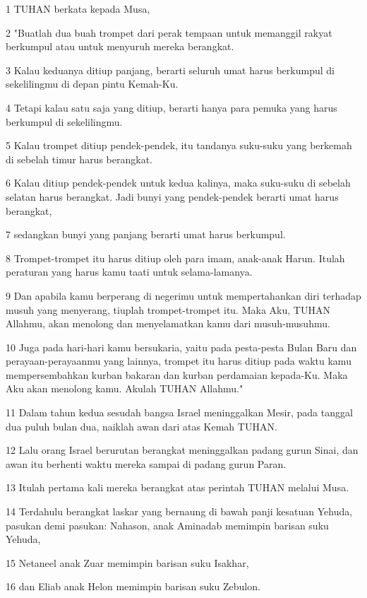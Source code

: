 \par 1 TUHAN berkata kepada Musa,
\par 2 "Buatlah dua buah trompet dari perak tempaan untuk memanggil rakyat berkumpul atau untuk menyuruh mereka berangkat.
\par 3 Kalau keduanya ditiup panjang, berarti seluruh umat harus berkumpul di sekelilingmu di depan pintu Kemah-Ku.
\par 4 Tetapi kalau satu saja yang ditiup, berarti hanya para pemuka yang harus berkumpul di sekelilingmu.
\par 5 Kalau trompet ditiup pendek-pendek, itu tandanya suku-suku yang berkemah di sebelah timur harus berangkat.
\par 6 Kalau ditiup pendek-pendek untuk kedua kalinya, maka suku-suku di sebelah selatan harus berangkat. Jadi bunyi yang pendek-pendek berarti umat harus berangkat,
\par 7 sedangkan bunyi yang panjang berarti umat harus berkumpul.
\par 8 Trompet-trompet itu harus ditiup oleh para imam, anak-anak Harun. Itulah peraturan yang harus kamu taati untuk selama-lamanya.
\par 9 Dan apabila kamu berperang di negerimu untuk mempertahankan diri terhadap musuh yang menyerang, tiuplah trompet-trompet itu. Maka Aku, TUHAN Allahmu, akan menolong dan menyelamatkan kamu dari musuh-musuhmu.
\par 10 Juga pada hari-hari kamu bersukaria, yaitu pada pesta-pesta Bulan Baru dan perayaan-perayaanmu yang lainnya, trompet itu harus ditiup pada waktu kamu mempersembahkan kurban bakaran dan kurban perdamaian kepada-Ku. Maka Aku akan menolong kamu. Akulah TUHAN Allahmu."
\par 11 Dalam tahun kedua sesudah bangsa Israel meninggalkan Mesir, pada tanggal dua puluh bulan dua, naiklah awan dari atas Kemah TUHAN.
\par 12 Lalu orang Israel berurutan berangkat meninggalkan padang gurun Sinai, dan awan itu berhenti waktu mereka sampai di padang gurun Paran.
\par 13 Itulah pertama kali mereka berangkat atas perintah TUHAN melalui Musa.
\par 14 Terdahulu berangkat laskar yang bernaung di bawah panji kesatuan Yehuda, pasukan demi pasukan: Nahason, anak Aminadab memimpin barisan suku Yehuda,
\par 15 Netaneel anak Zuar memimpin barisan suku Isakhar,
\par 16 dan Eliab anak Helon memimpin barisan suku Zebulon.
